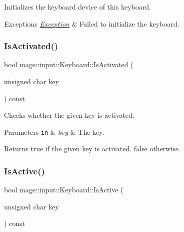 Initializes the keyboard device of this keyboard.


\begin{DoxyExceptions}{Exceptions}
{\em \mbox{\hyperlink{classmage_1_1_exception}{Exception}}} & Failed to initialize the keyboard. \\
\hline
\end{DoxyExceptions}
\mbox{\label{classmage_1_1input_1_1_keyboard_a110c61213216a2286d9bd099cafa729f}} 
\subsubsection{\texorpdfstring{Is\+Activated()}{IsActivated()}}
{\footnotesize\ttfamily bool mage\+::input\+::\+Keyboard\+::\+Is\+Activated (\begin{DoxyParamCaption}\item[{unsigned char}]{key }\end{DoxyParamCaption}) const\hspace{0.3cm}{\ttfamily [noexcept]}}

Checks whether the given key is activated.


\begin{DoxyParams}[1]{Parameters}
\mbox{\tt in}  & {\em key} & The key. \\
\hline
\end{DoxyParams}
\begin{DoxyReturn}{Returns}
{\ttfamily true} if the given key is activated. {\ttfamily false} otherwise. 
\end{DoxyReturn}
\mbox{\label{classmage_1_1input_1_1_keyboard_a6a9cc65baf06080c7496417de89cd1e5}} 
\subsubsection{\texorpdfstring{Is\+Active()}{IsActive()}}
{\footnotesize\ttfamily bool mage\+::input\+::\+Keyboard\+::\+Is\+Active (\begin{DoxyParamCaption}\item[{unsigned char}]{key }\end{DoxyParamCaption}) const\hspace{0.3cm}{\ttfamily [noexcept]}}

